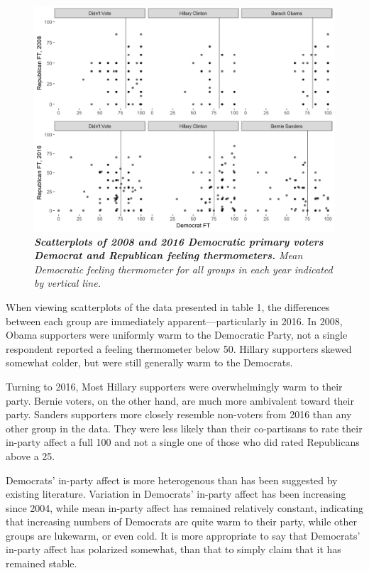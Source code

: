 \documentclass[12pt]{article}
\begin{document}
\begin{figure}[H]
\center\includegraphics[width=6in]{primary-scatter.png}
\caption{\label{fig:primary-scatter} \textit{\textbf{Scatterplots of 2008 and 2016 Democratic primary voters Democrat and Republican feeling thermometers.} Mean Democratic feeling thermometer for all groups in each year indicated by vertical line.}}
\end{figure}

When viewing scatterplots of the data presented in table 1, the differences between each group are immediately apparent---particularly in 2016. In 2008, Obama supporters were uniformly warm to the Democratic Party, not a single respondent reported a feeling thermometer below 50. Hillary supporters skewed somewhat colder, but were still generally warm to the Democrats. 

Turning to 2016, Most Hillary supporters were overwhelmingly warm to their party. Bernie voters, on the other hand, are much more ambivalent toward their party. Sanders supporters more closely resemble non-voters from 2016 than any other group in the data. They were less likely than their co-partisans to rate their in-party affect a full 100 and not a single one of those who did rated Republicans above a 25.

Democrats' in-party affect is more heterogenous than has been suggested by existing literature. Variation in Democrats' in-party affect has been increasing since 2004, while mean in-party affect has remained relatively constant, indicating that increasing numbers of Democrats are quite warm to their party, while other groups are lukewarm, or even cold. It is more appropriate to say that Democrats' in-party affect has polarized somewhat, than that to simply claim that it has remained stable.
\end{document}
